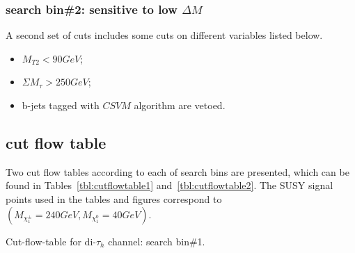 \subsubsection{search bin\#2: sensitive to low $\Delta M$}
A second set of cuts includes some cuts on different variables listed below.
\begin{itemize}
\item $M_{T2}<90GeV$;
\item $\Sigma M_{\tau}>250GeV$;
\item b-jets tagged with $CSVM$ algorithm are vetoed.
\end{itemize}
\subsection{cut flow table}
Two cut flow tables according to each of search bins are presented, which can be found in Tables~\ref{tbl:cutflowtable1} and~\ref{tbl:cutflowtable2}. The SUSY signal points used in the tables and figures correspond to $(M_{\chi_{1}^{\pm}}=240GeV,M_{\chi_{1}^{0}}=40GeV)$.   
\begin{table}
\begin{center}
\caption{Cut-flow-table for di-$\tau_h$ channel: search bin\#1.}
\label{tbl:cutflowtable1}
\caption{Cut-flow-table for di-$\tau_h$ channel: search bin\#2.}
\label{tbl:cutflowtable2}
\end{center}
\end{table}
